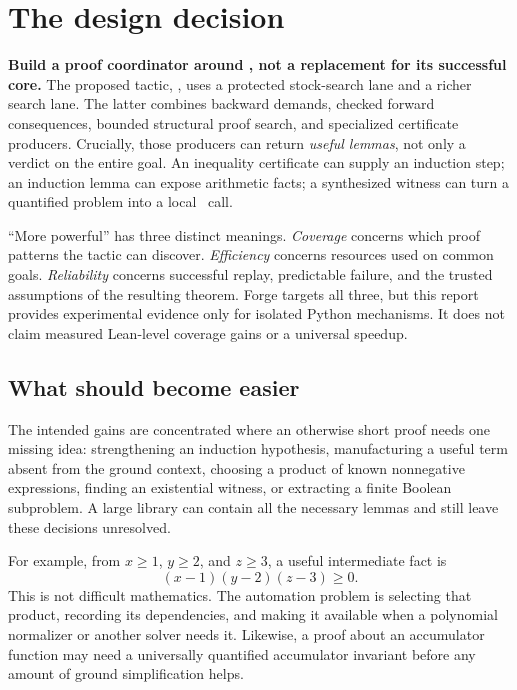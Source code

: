 \section{The design decision}

\textbf{Build a proof coordinator around \grind, not a replacement for its
successful core.} The proposed tactic, \forge, uses a protected stock-search
lane and a richer search lane. The latter combines backward demands, checked
forward consequences, bounded structural proof search, and specialized
certificate producers. Crucially, those producers can return \emph{useful
lemmas}, not only a verdict on the entire goal. An inequality certificate can
supply an induction step; an induction lemma can expose arithmetic facts;
a synthesized witness can turn a quantified problem into a local \grind\ call.

``More powerful'' has three distinct meanings. \emph{Coverage} concerns which
proof patterns the tactic can discover. \emph{Efficiency} concerns resources
used on common goals. \emph{Reliability} concerns successful replay, predictable
failure, and the trusted assumptions of the resulting theorem. Forge targets
all three, but this report provides experimental evidence only for isolated
Python mechanisms. It does not claim measured Lean-level coverage gains or a
universal speedup.

\subsection{What should become easier}

The intended gains are concentrated where an otherwise short proof needs one
missing idea: strengthening an induction hypothesis, manufacturing a useful
term absent from the ground context, choosing a product of known nonnegative
expressions, finding an existential witness, or extracting a finite Boolean
subproblem. A large library can contain all the necessary lemmas and still
leave these decisions unresolved.

For example, from $x\geq 1$, $y\geq 2$, and $z\geq 3$, a useful intermediate
fact is
\[
 (x-1)(y-2)(z-3)\geq0.
\]
This is not difficult mathematics. The automation problem is selecting that
product, recording its dependencies, and making it available when a polynomial
normalizer or another solver needs it. Likewise, a proof about an accumulator
function may need a universally quantified accumulator invariant before any
amount of ground simplification helps.


